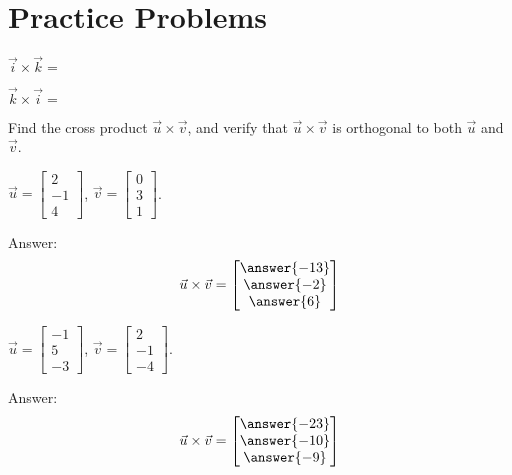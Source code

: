 \documentclass{ximera}
\begin{document}
 
\section*{Practice Problems}
\begin{problem}\label{prob:crossik}
$\vec{i}\times\vec{k}=$
\begin{multipleChoice}
  \end{multipleChoice}
\end{problem}
 
\begin{problem}\label{prob:crosski}
$\vec{k}\times\vec{i}=$
\begin{multipleChoice}
  \end{multipleChoice}
\end{problem}
 
\begin{problem} Find the cross product $\vec{u}\times\vec{v}$, and verify that $\vec{u}\times\vec{v}$ is orthogonal to both $\vec{u}$ and $\vec{v}$.
 
\begin{problem}\label{prob:crossuv1}
$\vec{u}=\begin{bmatrix}2\\-1\\4\end{bmatrix}$, $\vec{v}=\begin{bmatrix}0\\3\\1\end{bmatrix}$.
 
Answer:
$$\vec{u}\times\vec{v}=\begin{bmatrix}\answer{-13}\\\answer{-2}\\\answer{6}\end{bmatrix}$$
\end{problem}
 
\begin{problem}\label{prob:crossuv2}
$\vec{u}=\begin{bmatrix}-1\\5\\-3\end{bmatrix}$, $\vec{v}=\begin{bmatrix}2\\-1\\-4\end{bmatrix}$.
 
Answer:
$$\vec{u}\times\vec{v}=\begin{bmatrix}\answer{-23}\\\answer{-10}\\\answer{-9}\end{bmatrix}$$
\end{problem}
\end{problem}
 
\end{document}
